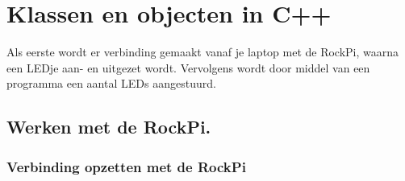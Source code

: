 \chapter{Klassen en objecten in C++}
Als eerste wordt er verbinding gemaakt vanaf je laptop met de RockPi, waarna een LEDje aan- en uitgezet wordt. Vervolgens wordt door middel van een programma een aantal LEDs aangestuurd.

\section{Werken met de RockPi.}

\subsection{Verbinding opzetten met de RockPi}\label{chp:contactPi}

